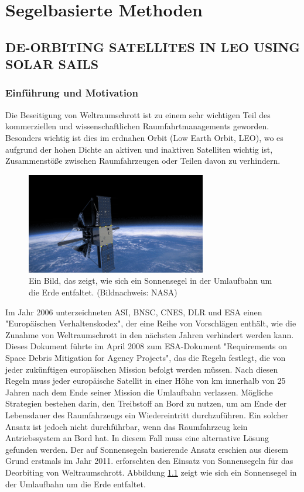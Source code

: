 \chapter{Segelbasierte Methoden}
\section{DE-ORBITING SATELLITES IN LEO USING SOLAR SAILS}
\subsection{Einführung und Motivation}
Die Beseitigung von Weltraumschrott ist zu einem sehr wichtigen Teil des kommerziellen und wissenschaftlichen Raumfahrtmanagements geworden. Besonders wichtig ist dies im erdnahen Orbit (Low Earth Orbit, LEO), wo es aufgrund der hohen Dichte an aktiven und inaktiven Satelliten wichtig ist, Zusammenstöße zwischen Raumfahrzeugen oder Teilen davon zu verhindern. 
\begin{figure}[htbp]
	\centering
	\includegraphics[width=0.7\textwidth]{bilder/Segel.png}
	\caption{Ein Bild, das zeigt, wie sich ein Sonnensegel in der Umlaufbahn um die Erde entfaltet. (Bildnachweis: NASA)}
	\label{Segel}
\end{figure}

Im Jahr 2006 unterzeichneten ASI, BNSC, CNES, DLR und ESA einen "Europäischen Verhaltenskodex", der eine Reihe von Vorschlägen enthält, wie die Zunahme von Weltraumschrott in den nächsten Jahren verhindert werden kann. Dieses Dokument führte im April 2008 zum ESA-Dokument "Requirements on Space Debris Mitigation for Agency Projects", das die Regeln festlegt, die von jeder zukünftigen europäischen Mission befolgt werden müssen. Nach diesen Regeln muss jeder europäische Satellit in einer Höhe von \unit[2000]{km} innerhalb von 25 Jahren nach dem Ende seiner Mission die Umlaufbahn verlassen. Mögliche Strategien bestehen darin, den Treibstoff an Bord zu nutzen, um am Ende der Lebensdauer des Raumfahrzeugs ein Wiedereintritt durchzuführen. Ein solcher Ansatz ist jedoch nicht durchführbar, wenn das Raumfahrzeug kein Antriebssystem an Bord hat. In diesem Fall muss eine alternative Lösung gefunden werden. Der auf Sonnensegeln basierende Ansatz erschien aus diesem Grund erstmals im Jahr 2011. \citet{Daniele:2012} erforschten den Einsatz von Sonnensegeln für das Deorbiting von Weltraumschrott. Abbildung \ref{Segel} zeigt wie sich ein Sonnensegel in der Umlaufbahn um die Erde entfaltet.


